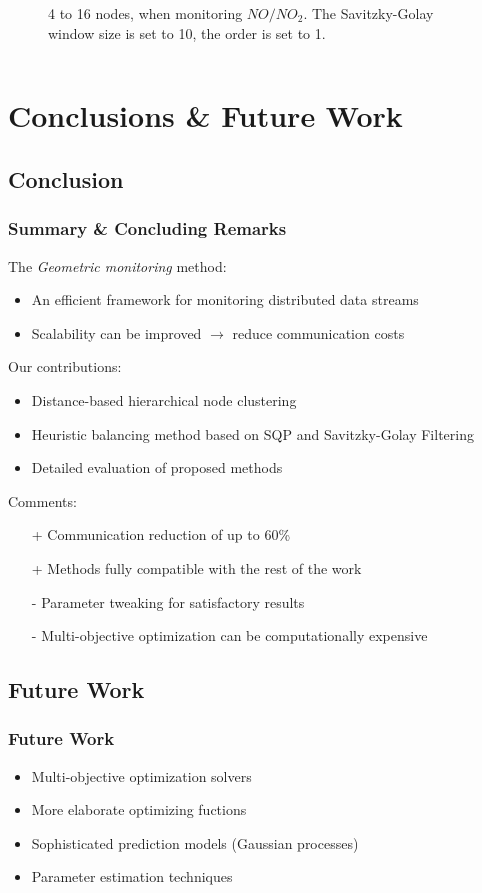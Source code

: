 \documentclass[hyperref={pdfpagelabels=false}]{beamer}
\begin{document}
\begin{frame}
\begin{columns}
\begin{column}[t]{0.5\linewidth}
\begin{figure}
  \caption{4 to 16 nodes, when monitoring $NO/NO_2$. The Savitzky-Golay window size is set to 10, the order is set to 1.}
\end{figure}
\end{column}
\end{columns}
\end{frame}
\section{Conclusions \& Future Work}
\begin{frame}
  \tableofcontents[currentsection]
\end{frame}

\subsection{Conclusion}
\begin{frame} \frametitle{Summary \& Concluding Remarks}
The \emph{Geometric monitoring} method:
\begin{itemize}
\item An efficient framework for monitoring distributed data streams
\item Scalability can be improved $\rightarrow$ reduce communication costs
\end{itemize}
Our contributions:
\begin{itemize}
\item Distance-based hierarchical node clustering
\item Heuristic balancing method based on SQP and Savitzky-Golay Filtering
\item Detailed evaluation of proposed methods
\end{itemize}
Comments:
\begin{itemize}
\item[+] Communication reduction of up to 60\%
\item[+] Methods fully compatible with the rest of the work
\item[-] Parameter tweaking for satisfactory results
\item[-] Multi-objective optimization can be computationally expensive
\end{itemize}
\end{frame}

\subsection{Future Work}
\begin{frame} \frametitle{Future Work}
\begin{itemize}
\item Multi-objective optimization solvers
\item More elaborate optimizing fuctions
\item Sophisticated prediction models (Gaussian processes)
\item Parameter estimation techniques
\end{itemize}
\end{frame}
\end{document}
